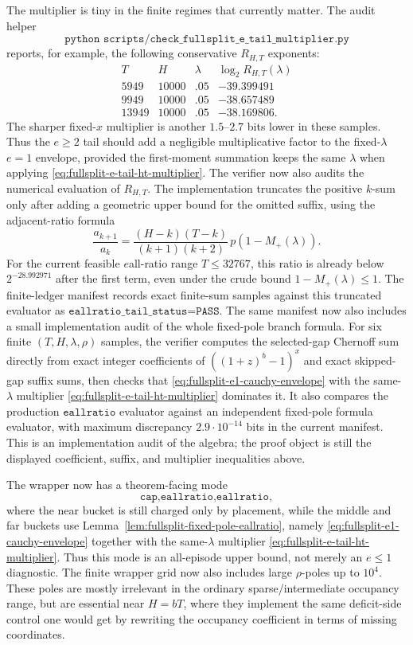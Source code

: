 The multiplier is tiny in the finite regimes that currently matter.  The audit helper
\[
\texttt{python scripts/check\_fullsplit\_e\_tail\_multiplier.py}
\]
reports, for example, the following conservative \(R_{H,T}\) exponents:
\[
\begin{array}{c|c|c|c}
T & H & \lambda & \log_2 R_{H,T}(\lambda)\\
\hline
5949 & 10000 & .05 & -39.399491\\
9949 & 10000 & .05 & -38.657489\\
13949 & 10000 & .05 & -38.169806 .
\end{array}
\]
The sharper fixed-\(x\) multiplier is another \(1.5\)--\(2.7\) bits lower in these samples.  Thus the \(e\ge2\) tail
should add a negligible multiplicative factor to the fixed-\(\lambda\) \(e=1\) envelope, provided the first-moment
summation keeps the same \(\lambda\) when applying \eqref{eq:fullsplit-e-tail-ht-multiplier}.
The verifier now also audits the numerical evaluation of \(R_{H,T}\).  The implementation truncates the positive
\(k\)-sum only after adding a geometric upper bound for the omitted suffix, using the adjacent-ratio formula
\[
\frac{a_{k+1}}{a_k}
=
\frac{(H-k)(T-k)}{(k+1)(k+2)}\,p(1-M_+(\lambda)).
\]
For the current feasible \(e\)all-ratio range \(T\le32767\), this ratio is already below
\(2^{-28.992971}\) after the first term, even under the crude bound \(1-M_+(\lambda)\le1\).  The finite-ledger
manifest records exact finite-sum samples against this truncated evaluator as
\(\texttt{eallratio\_tail\_status=PASS}\).
The same manifest now also includes a small implementation audit of the whole fixed-pole branch formula.  For six finite
\((T,H,\lambda,\rho)\) samples, the verifier computes the selected-gap Chernoff sum directly from exact integer
coefficients of \(((1+z)^b-1)^x\) and exact skipped-gap suffix sums, then checks that
\eqref{eq:fullsplit-e1-cauchy-envelope} with the same-\(\lambda\) multiplier
\eqref{eq:fullsplit-e-tail-ht-multiplier} dominates it.  It also compares the production
\(\texttt{eallratio}\) evaluator against an independent fixed-pole formula evaluator, with maximum discrepancy
\(2.9\cdot10^{-14}\) bits in the current manifest.  This is an implementation audit of the algebra; the proof object is
still the displayed coefficient, suffix, and multiplier inequalities above.

The wrapper now has a theorem-facing mode
\[
\texttt{cap,eallratio,eallratio},
\]
where the near bucket is still charged only by placement, while the middle and far buckets use
Lemma~\ref{lem:fullsplit-fixed-pole-eallratio}, namely \eqref{eq:fullsplit-e1-cauchy-envelope} together with the
same-\(\lambda\) multiplier \eqref{eq:fullsplit-e-tail-ht-multiplier}.  Thus this mode is an all-episode upper bound,
not merely an \(e\le1\) diagnostic.
The finite wrapper grid now also includes large \(\rho\)-poles up to \(10^4\).  These poles are mostly irrelevant in
the ordinary sparse/intermediate occupancy range, but are essential near \(H=bT\), where they implement the same
deficit-side control one would get by rewriting the occupancy coefficient in terms of missing coordinates.

